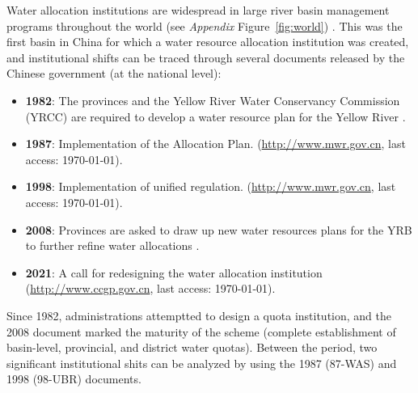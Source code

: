 \documentclass[default, sn-standardnature]{sn-jnl} %
\begin{document}
Water allocation institutions are widespread in large river basin management programs throughout the world (see \textit{Appendix} Figure~\ref{fig:world}) \cite{speed2013}.
This was the first basin in China for which a water resource allocation institution was created, and institutional shifts can be traced through several documents released by the Chinese government (at the national level)\cite{wang2019e}:
\begin{itemize}
    \item \textbf{1982}: The provinces and the Yellow River Water Conservancy Commission (YRCC) are required to develop a water resource plan for the Yellow River \cite{wang2019d, wang2019e}.
    \item \textbf{1987}: Implementation of the Allocation Plan. (\href{http://www.gov.cn/zhengce/content/2011-03/30/content_3138.htm#}{http://www.mwr.gov.cn}, last access: \today).
    \item \textbf{1998}: Implementation of unified regulation. (\href{http://www.mwr.gov.cn/ztpd/2013ztbd/2013fxkh/fxkhswcbcs/cs/flfg/201304/t20130411_433489.html}{http://www.mwr.gov.cn}, last access: \today).
    \item \textbf{2008}: Provinces are asked to draw up new water resources plans for the YRB to further refine water allocations \cite{wang2019d,wang2019e}.
    \item \textbf{2021}: A call for redesigning the water allocation institution (\href{http://www.ccgp.gov.cn/cggg/zygg/gkzb/202107/t20210721_16591901.htm}{http://www.ccgp.gov.cn}, last access: \today).
\end{itemize}

Since 1982, administrations attemptted to design a quota institution, and the 2008 document marked the maturity of the scheme (complete establishment of basin-level, provincial, and district water quotas).
Between the period, two significant institutional shits can be analyzed by using the 1987 (87-WAS) and 1998 (98-UBR) documents.

\end{document}
